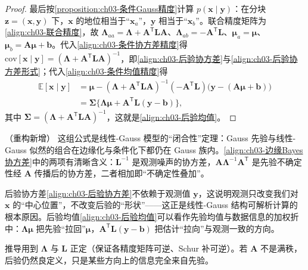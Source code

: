 \documentclass[../../main.tex]{subfiles}
\begin{document}
\begin{proof}
最后按\cref{proposition:ch03-条件Gauss精度}计算 $p(\boldsymbol{x}\mid\boldsymbol{y})$：在分块 $\boldsymbol{z}=(\boldsymbol{x},\boldsymbol{y})$ 下，$\boldsymbol{x}$ 的地位相当于“$\boldsymbol{x}_a$”，$\boldsymbol{y}$ 相当于“$\boldsymbol{x}_b$”。联合精度矩阵为\eqref{align:ch03-联合精度}，故 $\boldsymbol{\Lambda}_{aa}=\boldsymbol{\Lambda}+\boldsymbol{A}^{\mathsf{T}}\boldsymbol{L}\boldsymbol{A}$、$\boldsymbol{\Lambda}_{ab}=-\boldsymbol{A}^{\mathsf{T}}\boldsymbol{L}$、$\boldsymbol{\mu}_{a}=\boldsymbol{\mu}$、$\boldsymbol{\mu}_{b}=\boldsymbol{A}\boldsymbol{\mu}+\boldsymbol{b}$。代入\eqref{align:ch03-条件协方差精度}得 $\mathrm{cov}[\boldsymbol{x}\mid\boldsymbol{y}]=(\boldsymbol{\Lambda}+\boldsymbol{A}^{\mathsf{T}}\boldsymbol{L}\boldsymbol{A})^{-1}$，即\eqref{align:ch03-后验协方差}与\eqref{align:ch03-后验协方差形式}；代入\eqref{align:ch03-条件均值精度}得
\begin{align*}
\mathbb{E}[\boldsymbol{x}\mid\boldsymbol{y}]&=\boldsymbol{\mu}-(\boldsymbol{\Lambda}+\boldsymbol{A}^{\mathsf{T}}\boldsymbol{L}\boldsymbol{A})^{-1}(-\boldsymbol{A}^{\mathsf{T}}\boldsymbol{L})\bigl(\boldsymbol{y}-(\boldsymbol{A}\boldsymbol{\mu}+\boldsymbol{b})\bigr)\\
&=\boldsymbol{\Sigma}\bigl\{\boldsymbol{\Lambda}\boldsymbol{\mu}+\boldsymbol{A}^{\mathsf{T}}\boldsymbol{L}(\boldsymbol{y}-\boldsymbol{b})\bigr\},
\end{align*}
其中 $\boldsymbol{\Sigma}=(\boldsymbol{\Lambda}+\boldsymbol{A}^{\mathsf{T}}\boldsymbol{L}\boldsymbol{A})^{-1}$，这就是\eqref{align:ch03-后验均值}。
\end{proof}

\begin{remark}（重构新增）
这组公式是线性-Gauss 模型的“闭合性”定理：Gauss 先验与线性-Gauss 似然的组合在边缘化与条件化下都仍在 Gauss 族内。\eqref{align:ch03-边缘Bayes协方差}中的两项有清晰含义：$\boldsymbol{L}^{-1}$ 是观测噪声的协方差，$\boldsymbol{A}\boldsymbol{\Lambda}^{-1}\boldsymbol{A}^{\mathsf{T}}$ 是先验不确定性经 $\boldsymbol{A}$ 传播后的协方差，二者相加即“不确定性叠加”。

后验协方差\eqref{align:ch03-后验协方差}不依赖于观测值 $\boldsymbol{y}$，这说明观测只改变我们对 $\boldsymbol{x}$ 的“中心位置”，不改变后验的“形状”——这正是线性-Gauss 结构可解析计算的根本原因。后验均值\eqref{align:ch03-后验均值}可以看作先验均值与数据信息的加权折中：$\boldsymbol{\Lambda}\boldsymbol{\mu}$ 把先验“拉回”$\boldsymbol{\mu}$，$\boldsymbol{A}^{\mathsf{T}}\boldsymbol{L}(\boldsymbol{y}-\boldsymbol{b})$ 把估计“拉向”与观测一致的方向。

推导用到 $\boldsymbol{\Lambda}$ 与 $\boldsymbol{L}$ 正定（保证各精度矩阵可逆、Schur 补可逆）。若 $\boldsymbol{A}$ 不是满秩，后验仍然良定义，只是某些方向上的信息完全来自先验。
\end{remark}
\end{document}
